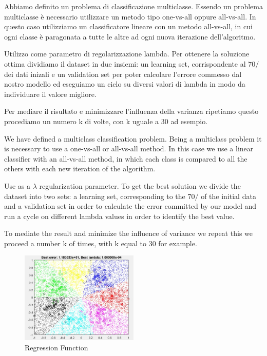 
Abbiamo definito un problema di classificazione multiclasse.
Essendo un problema multiclasse è necessario utilizzare un metodo tipo one-vs-all oppure all-vs-all.
In questo caso utilizziamo un classificatore lineare con un metodo all-vs-all, in cui ogni classe è paragonata a tutte le altre ad ogni nuova iterazione dell'algoritmo.

Utilizzo come parametro di regolarizzazione lambda.
Per ottenere la soluzione ottima dividiamo il dataset in due insiemi: un learning set, corrispondente al $70/$ dei dati inizali e un validation set per poter calcolare l'errore commesso dal nostro modello ed eseguiamo un ciclo su diversi valori di lambda in modo da individuare il valore migliore.

Per mediare il risultato e minimizzare l'influenza della varianza ripetiamo questo procediamo un numero k di volte, con k uguale a 30 ad esempio.

We have defined a multiclass classification problem.
Being a multiclass problem it is necessary to use a one-vs-all or all-vs-all method.
In this case we use a linear classifier with an all-vs-all method, in which each class is compared to all the others with each new iteration of the algorithm.

Use as a $\lambda$ regularization parameter.
To get the best solution we divide the dataset into two sets: a learning set, corresponding to the $ 70 / $ of the initial data and a validation set in order to calculate the error committed by our model and run a cycle on different lambda values in order to identify the best value.

To mediate the result and minimize the influence of variance we repeat this we proceed a number k of times, with k equal to 30 for example.
\begin{figure}[h]
	\centering
	\includegraphics[width=0.5\textwidth]{i1.png}
	\caption{Regression Function}
	\label{fig:regression function}
\end{figure}


